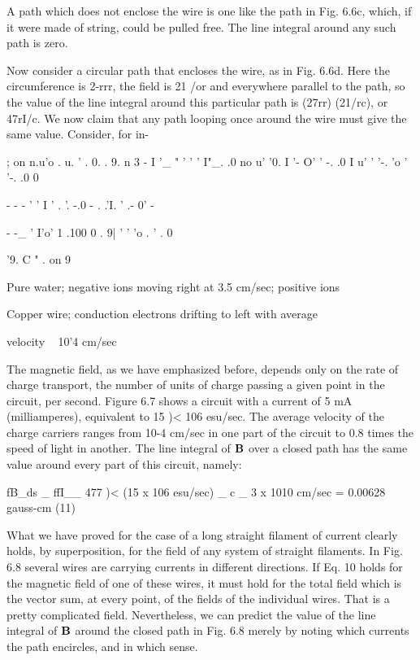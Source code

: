 A path which does not enclose the wire is one like the path in
Fig. 6.6c, which, if it were made of string, could be pulled free. The
line integral around any such path is zero.

Now consider a circular path that encloses the wire, as in Fig. 6.6d.
Here the circumference is 2-rrr, the field is 21 /or and everywhere parallel
to the path, so the value of the line integral around this particular
path is (27rr) (21/rc), or 47rI/c. We now claim that any path looping
once around the wire must give the same value. Consider, for in-

; on n.u'o . u. ' . 0. . 9. n 3 -
I '_ " ' ' ' I"_. .0 no u' '0. I '-
O' ' -. .0 I u' ' '-. 'o ' '-. .0 0

- - -
' ' I ' . '. -.0 - . .'I. ' .- 0'
-

- -_ ' I'o' 1 .100 0 . 9| ' ' 'o . ' . 0

'9. C " . on 9

Pure water; negative ions moving
right at 3.5 cm/sec; positive ions

Copper wire; conduction electrons
drifting to left with average

velocity ~ 10'4 cm/sec

The magnetic field, as we have emphasized before, depends only
on the rate of charge transport, the number of units of charge passing
a given point in the circuit, per second. Figure 6.7 shows a circuit
with a current of 5 mA (milliamperes), equivalent to 15 )< 106
esu/sec. The average velocity of the charge carriers ranges from
10-4 cm/sec in one part of the circuit to 0.8 times the speed of light
in another. The line integral of $\mathbf{B}$ over a closed path has the same
value around every part of this circuit, namely:

fB_ds _ ffI__ 477 )< (15 x 106 esu/sec)
_ c _ 3 x 1010 cm/sec
= 0.00628 gauss-cm (11)
\begin{equation}
\end{equation}

What we have proved for the case of a long straight filament of
current clearly holds, by superposition, for the field of any system
of straight filaments. In Fig. 6.8 several wires are carrying currents
in different directions. If Eq. 10 holds for the magnetic field of one
of these wires, it must hold for the total field which is the vector sum,
at every point, of the fields of the individual wires. That is a pretty
complicated field. Nevertheless, we can predict the value of the line
integral of $\mathbf{B}$ around the closed path in Fig. 6.8 merely by noting
which currents the path encircles, and in which sense.

